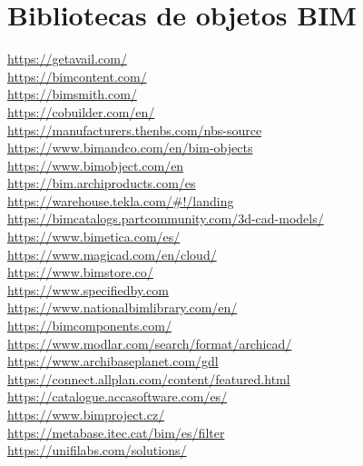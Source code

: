 \documentclass[spanish,12pt,a4paper,final,oneside]{book}
\begin{document}
\section{Bibliotecas de objetos BIM}
\url{https://getavail.com/}
\\ \url{https://bimcontent.com/}
\\ \url{https://bimsmith.com/}
\\ \url{https://cobuilder.com/en/} 
\\ \url{https://manufacturers.thenbs.com/nbs-source}
\\ \url{https://www.bimandco.com/en/bim-objects}
\\ \url{https://www.bimobject.com/en}
\\ \url{https://bim.archiproducts.com/es}
\\ \url{https://warehouse.tekla.com/#!/landing}
\\ \url{https://bimcatalogs.partcommunity.com/3d-cad-models/}
\\ \url{https://www.bimetica.com/es/}
\\ \url{https://www.magicad.com/en/cloud/}
\\ \url{https://www.bimstore.co/}
\\ \url{https://www.specifiedby.com}
\\ \url{https://www.nationalbimlibrary.com/en/}
\\ \url{https://bimcomponents.com/}
\\ \url{https://www.modlar.com/search/format/archicad/}
\\ \url{https://www.archibaseplanet.com/gdl}
\\ \url{https://connect.allplan.com/content/featured.html}
\\ \url{https://catalogue.accasoftware.com/es/}
\\ \url{https://www.bimproject.cz/}
\\ \url{https://metabase.itec.cat/bim/es/filter}
\\ \url{https://unifilabs.com/solutions/}
\end{document}
